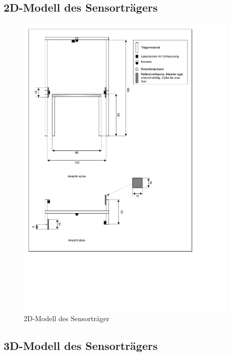 \newpage
\subsection{2D-Modell des Sensorträgers}

\begin{figure}[htpb]
  \centering
  \includegraphics[trim={0 6cm 0 0}, clip, width=0.95\textwidth]{./files/Sensortraeger/Skizze_Sensor_Traeger.pdf}
  \caption{2D-Modell des Sensorträger}
  \label{appendix:pdf:sensor_traeger_skizze}
\end{figure}


\newpage
\subsection{3D-Modell des Sensorträgers}

